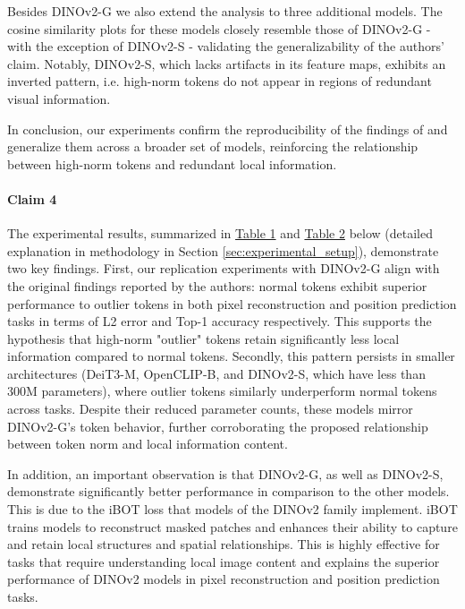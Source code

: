 \documentclass[10pt]{article} \usepackage[preprint]{tmlr}
\begin{document}
Besides DINOv2-G we also extend the analysis to three additional models. The cosine similarity plots for these models closely resemble those of DINOv2-G - with the exception of DINOv2-S - validating the generalizability of the authors' claim. Notably, DINOv2-S, which lacks artifacts in its feature maps, exhibits an inverted pattern, i.e. high-norm tokens do not appear in regions of redundant visual information.

In conclusion, our experiments confirm the reproducibility of the findings of \citet{darcet2024registers} and generalize them across a broader set of models, reinforcing the relationship between high-norm tokens and redundant local information.

\paragraph{Claim 4}
The experimental results, summarized in \hyperref[tab:pos_pred_results]{Table 1} and \hyperref[tab:pixel_recon_results]{Table 2} below (detailed explanation in methodology in Section \ref{sec:experimental_setup}), demonstrate two key findings. First, our replication experiments with DINOv2-G align with the original findings reported by the authors: normal tokens exhibit superior performance to outlier tokens in both pixel reconstruction and position prediction tasks in terms of L2 error and Top-1 accuracy respectively. This supports the hypothesis that high-norm "outlier" tokens retain significantly less local information compared to normal tokens. Secondly, this pattern persists in smaller architectures (DeiT3-M, OpenCLIP-B, and DINOv2-S, which have less than 300M parameters), where outlier tokens similarly underperform normal tokens across tasks. Despite their reduced parameter counts, these models mirror DINOv2-G’s token behavior, further corroborating the proposed relationship between token norm and local information content. 

In addition, an important observation is that DINOv2-G, as well as DINOv2-S, demonstrate significantly better performance in comparison to the other models. This is due to the iBOT loss \citep{zhou2022ibotimagebertpretraining} that models of the DINOv2 family implement. iBOT trains models to reconstruct masked patches and enhances their ability to capture and retain local structures and spatial relationships. This is highly effective for tasks that require understanding local image content and explains the superior performance of DINOv2 models in pixel reconstruction and position prediction tasks.
\end{document}
